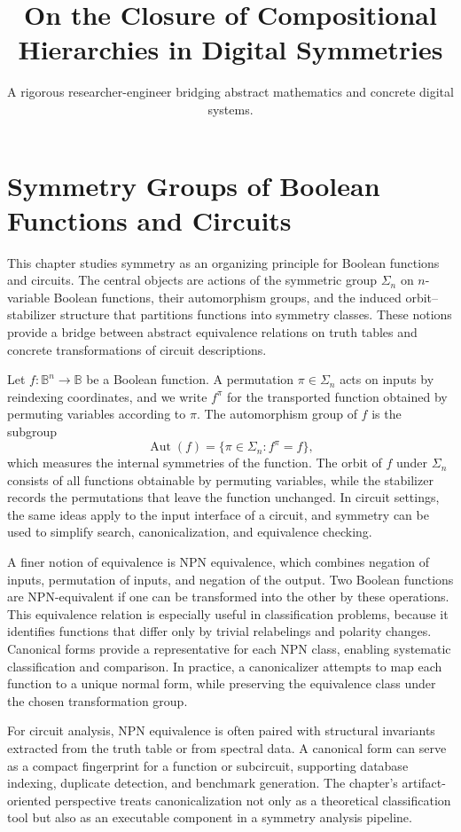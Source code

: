 \documentclass[11pt]{article}
\title{On the Closure of Compositional Hierarchies in Digital Symmetries}
\author{A rigorous researcher-engineer bridging abstract mathematics and concrete digital systems.}
\begin{document}
\section*{Symmetry Groups of Boolean Functions and Circuits}

This chapter studies symmetry as an organizing principle for Boolean functions and circuits. The central objects are actions of the symmetric group \(\Sigma_n\) on \(n\)-variable Boolean functions, their automorphism groups, and the induced orbit--stabilizer structure that partitions functions into symmetry classes. These notions provide a bridge between abstract equivalence relations on truth tables and concrete transformations of circuit descriptions.

Let \(f : \mathbb{B}^n \to \mathbb{B}\) be a Boolean function. A permutation \(\pi \in \Sigma_n\) acts on inputs by reindexing coordinates, and we write \(f^\pi\) for the transported function obtained by permuting variables according to \(\pi\). The automorphism group of \(f\) is the subgroup
\[
\operatorname{Aut}(f) = \{\pi \in \Sigma_n : f^\pi = f\},
\]
which measures the internal symmetries of the function. The orbit of \(f\) under \(\Sigma_n\) consists of all functions obtainable by permuting variables, while the stabilizer records the permutations that leave the function unchanged. In circuit settings, the same ideas apply to the input interface of a circuit, and symmetry can be used to simplify search, canonicalization, and equivalence checking.

A finer notion of equivalence is NPN equivalence, which combines negation of inputs, permutation of inputs, and negation of the output. Two Boolean functions are NPN-equivalent if one can be transformed into the other by these operations. This equivalence relation is especially useful in classification problems, because it identifies functions that differ only by trivial relabelings and polarity changes. Canonical forms provide a representative for each NPN class, enabling systematic classification and comparison. In practice, a canonicalizer attempts to map each function to a unique normal form, while preserving the equivalence class under the chosen transformation group.

For circuit analysis, NPN equivalence is often paired with structural invariants extracted from the truth table or from spectral data. A canonical form can serve as a compact fingerprint for a function or subcircuit, supporting database indexing, duplicate detection, and benchmark generation. The chapter's artifact-oriented perspective treats canonicalization not only as a theoretical classification tool but also as an executable component in a symmetry analysis pipeline.
\end{document}
